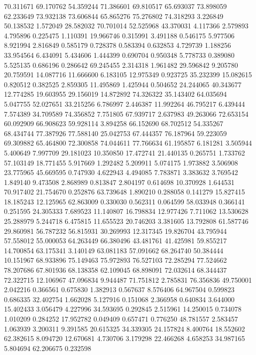 70.311671
69.170762
54.359244
71.386601
69.810517
65.693037
73.898059
62.233649
73.932138
73.606844
65.865276
75.276802
74.318293
3.226849
50.138532
1.572049
28.582032
70.701014
52.525968
43.370031
4.117366
2.579893
4.795896
0.225475
1.110391
19.966746
0.315991
3.491188
0.546175
5.977506
8.921994
2.816849
0.585179
0.728378
0.583394
0.632853
4.729739
1.188256
33.954564
6.434091
5.434606
1.444399
0.690704
0.950348
5.778733
0.389080
5.525135
0.686196
0.286642
69.245455
2.314318
1.961482
29.596842
9.205780
20.759591
14.087716
11.666600
6.183105
12.975349
0.923725
35.232399
15.082615
0.820512
0.382525
2.859305
11.495869
1.425944
0.504652
24.244065
40.343677
12.774285
19.603955
29.156019
14.872892
74.326322
35.143402
64.035694
5.047755
52.027651
33.215256
6.786997
2.446387
11.992264
46.795217
6.439444
7.574389
34.709589
74.356852
7.751805
67.939717
2.637983
49.263066
72.653154
60.092909
66.908623
59.928114
3.894258
66.152690
68.702512
54.335267
68.434744
77.387926
77.588140
25.042753
67.444357
76.187964
59.223059
69.309882
65.464800
72.300858
74.044611
77.766634
61.195857
6.181281
3.505944
5.400649
7.997709
29.181023
10.350850
17.472741
21.440135
0.265751
1.733762
57.103149
18.771455
5.917669
1.292482
5.209911
5.074175
1.973882
3.506908
23.775965
45.669595
0.747930
4.622943
4.494085
7.783871
3.383632
3.769542
1.849140
9.473508
2.868989
0.813847
2.804197
0.614698
10.370928
1.644531
70.917402
21.754670
0.252876
63.739648
1.890210
0.288058
0.141279
15.827415
18.185243
12.125965
62.863009
0.330030
0.562311
0.064599
58.033948
0.366141
0.251595
24.305333
7.689523
11.140807
16.798834
12.977426
7.711062
13.530628
25.288979
5.244718
6.475815
11.655523
20.746203
3.381605
13.792808
61.587746
29.860981
56.787232
56.815931
30.269993
12.317345
19.826704
43.795944
57.558012
55.000053
64.263449
66.380496
43.481761
41.425981
59.855217
14.700854
63.175341
3.140149
63.081183
57.091662
68.264740
50.384444
10.151967
68.933896
75.149463
75.972893
76.527103
72.285294
77.524662
78.207686
67.801936
68.138358
62.109045
68.898091
72.032614
68.344437
72.322715
12.106967
47.096834
9.944487
71.751812
2.785831
76.356836
49.750001
2.042216
0.366561
0.675830
1.382913
0.567637
8.576406
64.967504
0.599823
0.686335
32.402754
1.662028
5.127916
0.151068
2.366958
0.640834
3.644000
15.402433
3.056479
4.227996
34.593695
0.292845
2.515961
14.250015
0.734078
1.010209
0.284252
17.952782
0.049409
0.657471
0.776250
48.781557
2.583457
1.063939
3.200311
9.391585
20.615325
34.339305
24.157824
8.400764
18.552602
62.382615
8.094720
12.670681
4.730706
3.179298
22.466268
4.658253
34.987165
5.804694
62.206675
0.232598
